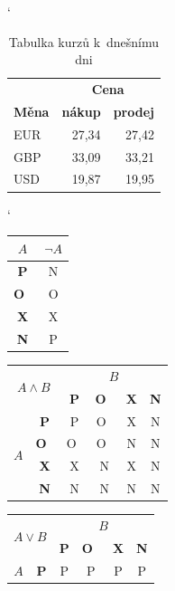 \documentclass[a4paper,11pt]{article}
\begin{document}
\begin{table}[h]
\catcode`
\begin{center}
\begin{tabular}{|l|r|r|}
\hline
& \multicolumn{2}{|c|}{\bfseries Cena}\\ 
\cline{2-3}
\bfseries Měna & \bfseries nákup & \bfseries prodej\\
\hline
EUR & 27,34 & 27,42\\
GBP & 33,09 & 33,21\\
USD & 19,87 & 19,95\\ 
\hline
\end{tabular}
\caption{Tabulka kurzů k~dnešnímu dni}
\label{tab1}
\end{center}
\end{table}

\begin{table}[h]
\catcode`
\begin{center}
\begin{tabular}{|c|c|}
\hline
$A$ & $\neg A$\\
\hline
\bfseries P & N\\
\hline
\bfseries O~& O\\
\hline
\bfseries X & X\\
\hline
\bfseries N & P\\
\hline
\end{tabular}
\begin{tabular}{|c|c|c|c|c|c|}
\hline
\multicolumn{2}{|c|}{\multirow{2}{*}{$A \wedge B$}} & \multicolumn{4}{|c|}{$B$}\\ \cline{3-6}
\multicolumn{2}{|c|}{} & \bfseries P & \bfseries O~& \bfseries X & \bfseries N\\
\hline
\multicolumn{1}{|c|}{\multirow{4}{*}{$A$}} & \bfseries P & P & O~& X & N\\
\cline{2-6}
\multicolumn{1}{|c|}{} & \bfseries O~& O~& O~& N & N\\
\cline{2-6}
\multicolumn{1}{|c|}{} & \bfseries X & X & N & X & N\\
\cline{2-6}
\multicolumn{1}{|c|}{} & \bfseries N & N & N & N & N\\
\hline
\end{tabular}
\begin{tabular}{|c|c|c|c|c|c|}
\hline
\multicolumn{2}{|c|}{\multirow{2}{*}{$A \vee B$}} & \multicolumn{4}{|c|}{$B$}\\ \cline{3-6}
\multicolumn{2}{|c|}{} & \bfseries P & \bfseries O~& \bfseries X & \bfseries N\\
\hline
\multicolumn{1}{|c|}{\multirow{4}{*}{$A$}} & \bfseries P & P & P & P & P\\

\end{tabular}
\end{center}
\end{table}
\end{document}
